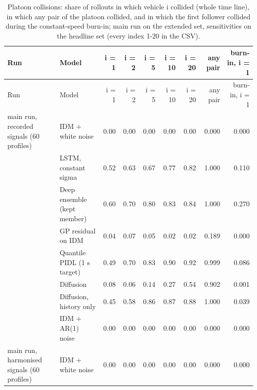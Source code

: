 \begingroup
\footnotesize
\begin{longtable}{llrrrrrrr}
\caption{Platoon collisions: share of rollouts in which vehicle i collided (whole time line), in which any pair of the platoon collided, and in which the first follower collided during the constant-speed burn-in; main run on the extended set, sensitivities on the headline set (every index 1-20 in the CSV).}\label{tab:t6-collisions} \\
\toprule
Run & Model & i = 1 & i = 2 & i = 5 & i = 10 & i = 20 & any pair & burn-in, i = 1 \\
\midrule
\endfirsthead
\toprule
Run & Model & i = 1 & i = 2 & i = 5 & i = 10 & i = 20 & any pair & burn-in, i = 1 \\
\midrule
\endhead
\bottomrule
\endlastfoot
main run, recorded signals (60 profiles) & IDM + white noise & 0.00 & 0.00 & 0.00 & 0.00 & 0.00 & 0.000 & 0.000 \\
 & LSTM, constant sigma & 0.52 & 0.63 & 0.67 & 0.77 & 0.82 & 1.000 & 0.110 \\
 & Deep ensemble (kept member) & 0.60 & 0.70 & 0.80 & 0.83 & 0.84 & 1.000 & 0.270 \\
 & GP residual on IDM & 0.04 & 0.07 & 0.05 & 0.02 & 0.02 & 0.189 & 0.000 \\
 & Quantile PIDL (1 s target) & 0.49 & 0.70 & 0.83 & 0.90 & 0.92 & 0.999 & 0.086 \\
 & Diffusion & 0.08 & 0.06 & 0.14 & 0.27 & 0.54 & 0.902 & 0.001 \\
 & Diffusion, history only & 0.45 & 0.58 & 0.86 & 0.87 & 0.88 & 1.000 & 0.039 \\
 & IDM + AR(1) noise & 0.00 & 0.00 & 0.00 & 0.00 & 0.00 & 0.000 & 0.000 \\
\midrule
main run, harmonised signals (60 profiles) & IDM + white noise & 0.00 & 0.00 & 0.00 & 0.00 & 0.00 & 0.000 & 0.000 \\

\end{longtable}
